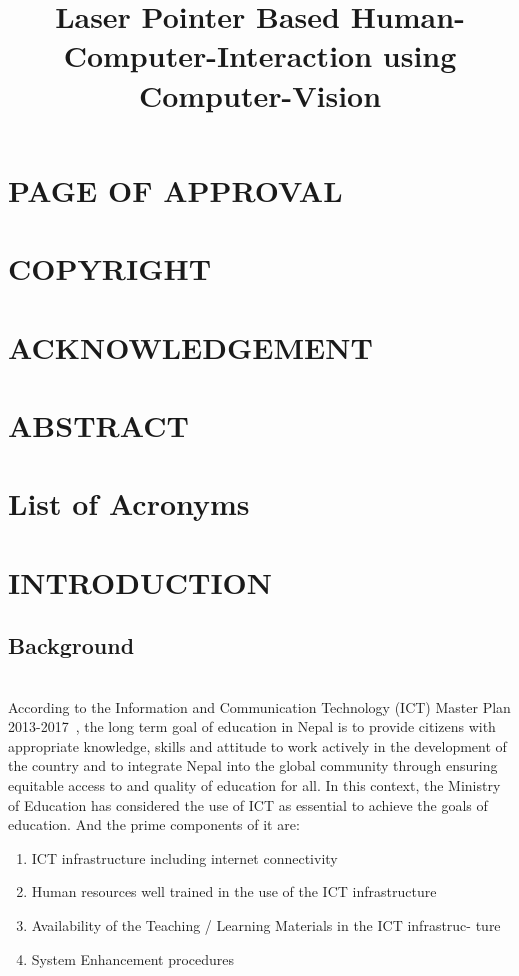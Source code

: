 \documentclass[12pt, a4paper]{article}
\title{\textbf{Laser Pointer Based Human-Computer-Interaction using Computer-Vision}}
\begin{document}
	
	
	\setcounter{page}{2}
	\section*{PAGE OF APPROVAL}
		
	\newpage
	\section*{COPYRIGHT}
		
	\newpage
	
	\section*{ACKNOWLEDGEMENT}
		
	
	\newpage
	\section*{ABSTRACT}
	
	
	
	\newpage
	\tableofcontents 
	\newpage
	\listoffigures
	\newpage
	\listoftables
	\newpage
	\section*{List of Acronyms}
		
	\clearpage
	\linespread{1.5}
	\newpage
\section{INTRODUCTION}
\vspace{0.4cm}
\subsection{Background}
~\\
According to the Information and Communication Technology (ICT) Master Plan 2013-2017~\cite{kir}, the long term
goal of education in Nepal is to provide citizens with appropriate knowledge,
skills and attitude to work actively in the development of the country and to
integrate Nepal into the global community through ensuring equitable access
to and quality of education for all. In this context, the Ministry of Education
has considered the use of ICT as essential to achieve the goals of education. And the prime components of it are:
\begin{enumerate}
\item ICT infrastructure including internet connectivity
\item Human resources well trained in the use of the ICT infrastructure
\item Availability of the Teaching / Learning Materials in the ICT infrastruc-
ture
\item System Enhancement procedures
\end{enumerate}
\end{document}
